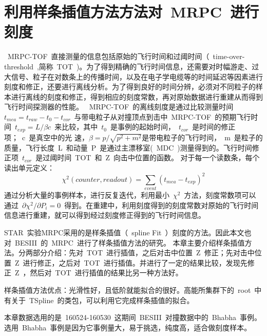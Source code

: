 \chapter{利用样条插值方法方法对~MRPC~进行刻度}

~MRPC-TOF~直接测量的信息包括原始的飞行时间和过阈时间（~time-over-threshold~,简称~TOT~)。为了得到精确的飞行时间信息，还需要对时幅游走、过大信号、粒子在对数条上的传播时间，以及在电子学电缆等的时间延迟等因素进行刻度和修正，还要进行离线分析。为了得到良好的时间分辨，必须对不同粒子的样本进行离线的刻度和修正，得到相应的刻度常数，再对原始数据进行重建从而得到飞行时间探测器的性能。
~MRPC-TOF~的离线刻度是通过比较测量时间~$t_{mea}=t_{raw}-t_{0}-t_{cor}$~与带电粒子从对撞顶点到击中~MRPC-TOF~的预期飞行时间~$t_{exp}=L/\beta c$~来比较，其中~$t_{0}$~是事例的起始时间，~$t_{cor}$~是时间的修正项；~c~是真空中的光
速，$\beta=p/\sqrt{p^2+m^2}$是带电粒子的飞行时间，~m~是粒子的质量，飞行长度~L~和动量~P~是通过主漂移室(~MDC~)测量得到的。飞行时间修正项~$t_{cor}$~是过阈时间~TOT~和~Z~向击中位置的函数。
对于每一个读数条，每个读出单元定义：
\begin{displaymath}
\chi^2(counter,readout)=\sum\limits_{event}(t_{mea}-t_{exp})^2
\end{displaymath}
通过分析大量的事例样本，进行反复迭代，利用最小~$\chi^2$~方法，刻度常数项可以通过~$\partial\chi^2/\partial P_{i}=0$~得到。在重建中，利用刻度得到的刻度常数对原始的飞行时间信息进行重建，就可以得到经过刻度修正得到的飞行时间信息。

STAR~实验MRPC采用的是样条插值（~spline Fit~）刻度的方法。因此本文也对~BESIII~的~MRPC~进行了样条插值方法的研究。
本章主要介绍样条插值方法。分两部分介绍：先对~TOT~进行插值，之后对击中位置~Z~修正；先对击中位置~Z~进行修正，之后对~TOT~进行插值。并进行了一定的结果比较，发现先修正~Z~，然后对~TOT~进行插值的结果比另一种方法好。

样条插值方法优点：光滑性好，且低阶就能拟合的很好。高能所集群下的~root~中有关于~TSpline~的类包，可以利用它完成样条插值的拟合。

本章数据选用的是~160524-160530~这期间~BESIII~对撞数据中的~Bhabha~事例。选用~Bhabha~事例是因为它事例量大，易于挑选，纯度高，适合做刻度样本。

